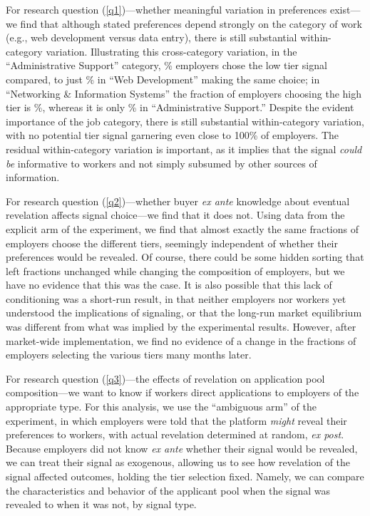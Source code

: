 For research question (\ref{q1})---whether meaningful variation in preferences exist---we find that although stated preferences depend strongly on the category of work (e.g., web development versus data entry), there is still substantial within-category variation. 
Illustrating this cross-category variation, in the ``Administrative Support'' category, \fracLowAdminSpt{}\% employers chose the low tier signal compared, to just \fracLowWeb{}\% in ``Web Development'' making the same choice; in ``Networking \& Information Systems'' the fraction of employers choosing the high tier is \fracHighNetworking{}\%, whereas it is only \fracHighAdminSpt{}\% in ``Administrative Support.''
Despite the evident importance of the job category, there is still substantial within-category variation, with no potential tier signal garnering even close to 100\% of employers.
The residual within-category variation is important, as it implies that the signal \emph{could be} informative to workers and not simply subsumed by other sources of information.

For research question (\ref{q2})---whether buyer \emph{ex ante} knowledge about eventual revelation affects signal choice---we find that it does not.
Using data from the explicit arm of the experiment, we find that almost exactly the same fractions of employers choose the different tiers, seemingly independent of whether their preferences would be revealed.
Of course, there could be some hidden sorting that left fractions unchanged while changing the composition of employers, but we have no evidence that this was the case.
It is also possible that this lack of conditioning was a short-run result, in that neither employers nor workers yet understood the implications of signaling, or that the long-run market equilibrium was different from what was implied by the experimental results. 
However, after market-wide implementation, we find no evidence of a change in the fractions of employers selecting the various tiers many months later.

For research question (\ref{q3})---the effects of revelation on application pool composition---we want to know if workers direct applications to employers of the appropriate type.
For this analysis, we use the  ``ambiguous arm'' of the experiment, in which employers were told that the platform \emph{might} reveal their preferences to workers, with actual revelation determined at random, \emph{ex post}. 
Because employers did not know \emph{ex ante} whether their signal would be revealed, we can treat their signal as exogenous, allowing us to see how revelation of the signal affected outcomes, holding the tier selection fixed.
Namely, we can compare the characteristics and behavior of the applicant pool when the signal was revealed to when it was not, by signal type.

